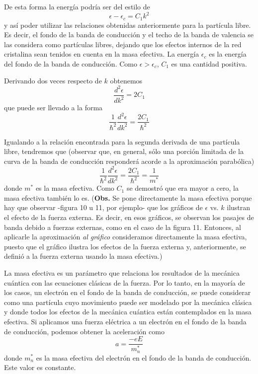 \documentclass[12pt,a4paper]{article}
\begin{document}
De esta forma la energía podría ser del estilo de
\[ \epsilon - \epsilon _{c} = C_{1}k^{2} \]
y así poder utilizar las relaciones obtenidas anteriormente para la partícula libre. Es decir, el fondo de la banda de conducción y el techo de la banda de valencia se las considera como partículas libres, dejando que los efectos internos de la red cristalina sean tenidos en cuenta en la masa efectiva. La energía $\epsilon _{c}$ es la energía del fondo de la banda de conducción. Como $\epsilon>\epsilon _{c}$, $C_{1}$ es una cantidad positiva.

Derivando dos veces respecto de $k$ obtenemos
\[ \frac{d^{2} \epsilon}{dk^{2}} = 2C_{1} \]
que puede ser llevado a la forma
\[ \frac{1}{\hbar^{2}} \frac{d^{2} \epsilon}{dk^{2}} = \frac{2C_{1}}{\hbar^{2}} \]

Igualando a la relación encontrada para la segunda derivada de una partícula libre, tendremos que (observar que, en general, sólo una porción limitada de la curva de la banda de conducción responderá acorde a la aproximación parabólica)
\[ \frac{1}{\hbar^{2}} \frac{d^{2} \epsilon}{dk^{2}} = \frac{2C_{1}}{\hbar^{2}} = \frac{1}{m^{\ast}} \]
donde $m^{\ast}$ es la masa efectiva. Como $C_{1}$ se demostró que era mayor a cero, la masa efectiva también lo es. (\textbf{Obs.} Se pone directamente la masa efectiva porque hay que observar -figura 10 u 11, por ejemplo- que los gráficos de $\epsilon$ vs. $k$ ilustran el efecto de la fuerza externa. Es decir, en esos gráficos, se observan los pasajes de banda debido a fuerzas externas, como en el caso de la figura 11. Entonces, al aplicarle la aproximación \emph{al gráfico} consideramos directamente la masa efectiva, puesto que el gráfico ilustra los efectos de la fuerza externa y, anteriormente, se definió a la fuerza externa usando la masa efectiva.)

La masa efectiva es un parámetro que relaciona los resultados de la mecánica cuántica con las ecuaciones clásicas de la fuerza. Por lo tanto, en la mayoría de los casos, un electrón en el fondo de la banda de conducción, se puede considerar como una partícula cuyo movimiento puede ser modelado por la mecánica clásica y donde todos los efectos de la mecánica cuántica están contemplados en la masa efectiva. Si aplicamos una fuerza eléctrica a un electrón en el fondo de la banda de conducción, podemos obtener la aceleración como
\[ a = \frac{-eE}{m_{n}^{\ast}} \]
donde $m_{n}^{\ast}$ es la masa efectiva del electrón en el fondo de la banda de conducción. Este valor es constante.
\end{document}
